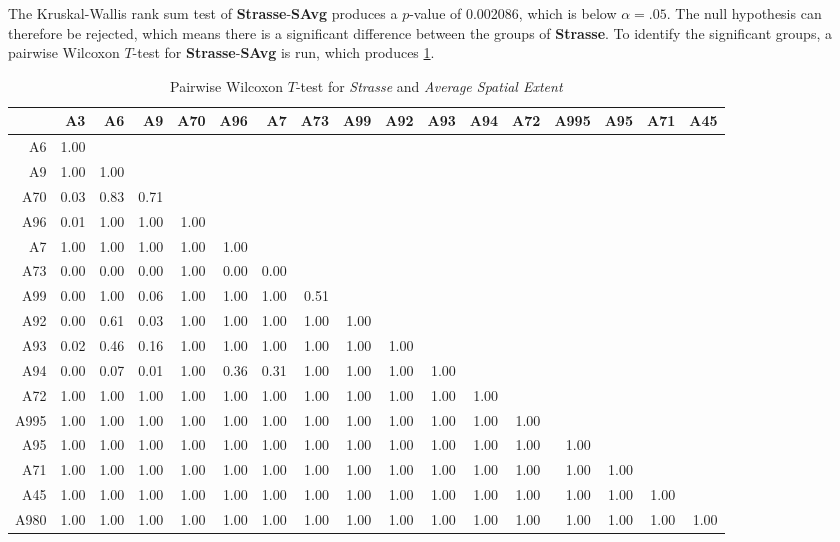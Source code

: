The Kruskal-Wallis rank sum test of \textbf{Strasse}-\textbf{SAvg} produces a $p$-value of 0.002086, which is below $\alpha=.05$. The null hypothesis can therefore be rejected, which means there is a significant difference between the groups of \textbf{Strasse}. To identify the significant groups, a pairwise Wilcoxon $T$-test for \textbf{Strasse}-\textbf{SAvg} is run, which produces \cref{tbl:wilcoxon_baysis_matched_Strasse_SAvg}.
\begin{table}[ht]
	\tiny
	\setlength{\tabcolsep}{4pt}
	\centering
	\begin{tabular}{rrrrrrrrrrrrrrrrr}
		\toprule
	 		 & A3 & A6 & A9 & A70 & A96 & A7 & A73 & A99 & A92 & A93 & A94 & A72 & A995 & A95 & A71 & A45 \\ 
		\midrule
		A6   & 1.00 &  &  &  &  &  &  &  &  &  &  &  &  &  &  &  \\ 
	  	A9   & 1.00 & 1.00 &  &  &  &  &  &  &  &  &  &  &  &  &  &  \\ 
	  	A70  & 0.03 & 0.83 & 0.71 &  &  &  &  &  &  &  &  &  &  &  &  &  \\ 
	  	A96  & 0.01 & 1.00 & 1.00 & 1.00 &  &  &  &  &  &  &  &  &  &  &  &  \\ 
	  	A7   & 1.00 & 1.00 & 1.00 & 1.00 & 1.00 &  &  &  &  &  &  &  &  &  &  &  \\ 
	  	A73  & 0.00 & 0.00 & 0.00 & 1.00 & 0.00 & 0.00 &  &  &  &  &  &  &  &  &  &  \\ 
	  	A99  & 0.00 & 1.00 & 0.06 & 1.00 & 1.00 & 1.00 & 0.51 &  &  &  &  &  &  &  &  &  \\ 
	  	A92  & 0.00 & 0.61 & 0.03 & 1.00 & 1.00 & 1.00 & 1.00 & 1.00 &  &  &  &  &  &  &  &  \\ 
	  	A93  & 0.02 & 0.46 & 0.16 & 1.00 & 1.00 & 1.00 & 1.00 & 1.00 & 1.00 &  &  &  &  &  &  &  \\ 
	  	A94  & 0.00 & 0.07 & 0.01 & 1.00 & 0.36 & 0.31 & 1.00 & 1.00 & 1.00 & 1.00 &  &  &  &  &  &  \\ 
	  	A72  & 1.00 & 1.00 & 1.00 & 1.00 & 1.00 & 1.00 & 1.00 & 1.00 & 1.00 & 1.00 & 1.00 &  &  &  &  &  \\ 
	  	A995 & 1.00 & 1.00 & 1.00 & 1.00 & 1.00 & 1.00 & 1.00 & 1.00 & 1.00 & 1.00 & 1.00 & 1.00 &  &  &  &  \\ 
	  	A95  & 1.00 & 1.00 & 1.00 & 1.00 & 1.00 & 1.00 & 1.00 & 1.00 & 1.00 & 1.00 & 1.00 & 1.00 & 1.00 &  &  &  \\ 
	  	A71  & 1.00 & 1.00 & 1.00 & 1.00 & 1.00 & 1.00 & 1.00 & 1.00 & 1.00 & 1.00 & 1.00 & 1.00 & 1.00 & 1.00 &  &  \\ 
	  	A45  & 1.00 & 1.00 & 1.00 & 1.00 & 1.00 & 1.00 & 1.00 & 1.00 & 1.00 & 1.00 & 1.00 & 1.00 & 1.00 & 1.00 & 1.00 &  \\ 
	  	A980 & 1.00 & 1.00 & 1.00 & 1.00 & 1.00 & 1.00 & 1.00 & 1.00 & 1.00 & 1.00 & 1.00 & 1.00 & 1.00 & 1.00 & 1.00 & 1.00 \\ 
		\bottomrule
	\end{tabular}
	\caption{Pairwise Wilcoxon $T$-test for \textit{Strasse} and \textit{Average Spatial Extent}}
	\label{tbl:wilcoxon_baysis_matched_Strasse_SAvg}
\end{table}
